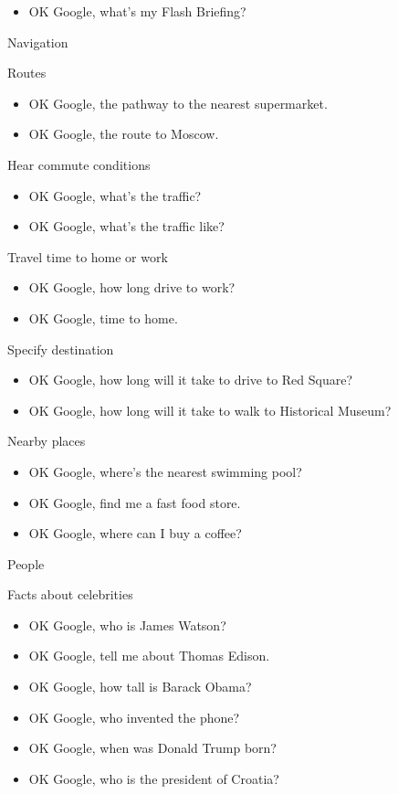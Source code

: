 \documentclass[
  letterpaper,
  DIV=11,
  numbers=noendperiod]{scrartcl}
\providecommand{\tightlist}{%
  \setlength{\itemsep}{0pt}\setlength{\parskip}{0pt}}\usepackage{longtable,booktabs,array}
\begin{document}
\begin{itemize}
\tightlist
\item
  OK Google, what's my Flash Briefing?
\end{itemize}

Navigation

Routes

\begin{itemize}
\item
  OK Google, the pathway to the nearest supermarket.
\item
  OK Google, the route to Moscow.
\end{itemize}

Hear commute conditions

\begin{itemize}
\item
  OK Google, what's the traffic?
\item
  OK Google, what's the traffic like?
\end{itemize}

Travel time to home or work

\begin{itemize}
\item
  OK Google, how long drive to work?
\item
  OK Google, time to home.
\end{itemize}

Specify destination

\begin{itemize}
\item
  OK Google, how long will it take to drive to Red Square?
\item
  OK Google, how long will it take to walk to Historical Museum?
\end{itemize}

Nearby places

\begin{itemize}
\item
  OK Google, where's the nearest swimming pool?
\item
  OK Google, find me a fast food store.
\item
  OK Google, where can I buy a coffee?
\end{itemize}

People

Facts about celebrities

\begin{itemize}
\item
  OK Google, who is James Watson?
\item
  OK Google, tell me about Thomas Edison.
\item
  OK Google, how tall is Barack Obama?
\item
  OK Google, who invented the phone?
\item
  OK Google, when was Donald Trump born?
\item
  OK Google, who is the president of Croatia?
\end{itemize}
\end{document}
